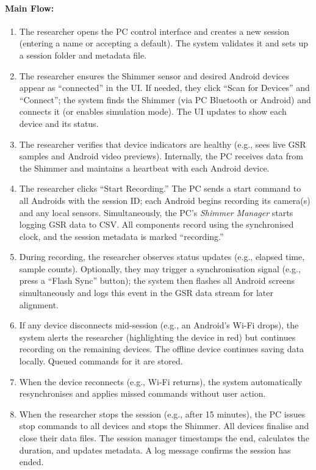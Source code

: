 \paragraph{Main Flow:}
\begin{enumerate}
    \item The researcher opens the PC control interface and creates a new session (entering a name or accepting a default). The system validates it and sets up a session folder and metadata file.
    \item The researcher ensures the Shimmer sensor and desired Android devices appear as “connected” in the UI. If needed, they click “Scan for Devices” and “Connect”; the system finds the Shimmer (via PC Bluetooth or Android) and connects it (or enables simulation mode). The UI updates to show each device and its status.
    \item The researcher verifies that device indicators are healthy (e.g., sees live GSR samples and Android video previews). Internally, the PC receives data from the Shimmer and maintains a heartbeat with each Android device.
    \item The researcher clicks “Start Recording.” The PC sends a start command to all Androids with the session ID; each Android begins recording its camera(s) and any local sensors. Simultaneously, the PC’s \textit{Shimmer Manager} starts logging GSR data to CSV. All components record using the synchronised clock, and the session metadata is marked “recording.”
    \item During recording, the researcher observes status updates (e.g., elapsed time, sample counts). Optionally, they may trigger a synchronisation signal (e.g., press a “Flash Sync” button); the system then flashes all Android screens simultaneously and logs this event in the GSR data stream for later alignment.
    \item If any device disconnects mid-session (e.g., an Android’s Wi-Fi drops), the system alerts the researcher (highlighting the device in red) but continues recording on the remaining devices. The offline device continues saving data locally. Queued commands for it are stored.
    \item When the device reconnects (e.g., Wi-Fi returns), the system automatically resynchronises and applies missed commands without user action.
    \item When the researcher stops the session (e.g., after 15 minutes), the PC issues stop commands to all devices and stops the Shimmer. All devices finalise and close their data files. The session manager timestamps the end, calculates the duration, and updates metadata. A log message confirms the session has ended.

\end{enumerate}
